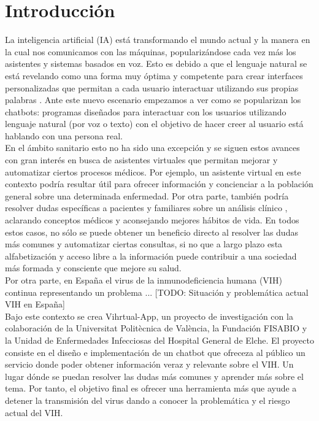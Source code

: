 \section{Introducción}
La inteligencia artificial (IA) está transformando el mundo actual y la manera en la cual nos comunicamos con las máquinas, popularizándose cada vez más los asistentes y sistemas basados en voz. Esto es debido a que el lenguaje natural se está revelando como una forma muy óptima y competente para crear interfaces personalizadas que permitan a cada usuario interactuar utilizando sus propias palabras \cite{naturalDialogue} . Ante este nuevo escenario empezamos a ver como se popularizan los chatbots: programas diseñados para interactuar con los usuarios utilizando lenguaje natural (por voz o texto) con el objetivo de hacer creer al usuario está hablando con una persona real. \\

En el ámbito sanitario esto no ha sido una excepción y se siguen estos avances con gran interés en busca de asistentes virtuales que permitan mejorar y automatizar ciertos procesos médicos\cite{healthAgents}. Por ejemplo, un asistente virtual en este contexto podría resultar útil para ofrecer información y concienciar a la población general sobre una determinada enfermedad. Por otra parte, también podría resolver dudas específicas a pacientes y familiares sobre un análisis clínico \cite{healthAgents}, aclarando conceptos médicos y aconsejando mejores hábitos de vida. En todos estos casos, no sólo se puede obtener un beneficio directo al resolver las dudas más comunes y automatizar ciertas consultas, si no que a largo plazo esta alfabetización y acceso libre a la información puede contribuir a una sociedad más formada y consciente que mejore su salud.\\

Por otra parte, en España el virus de la inmunodeficiencia humana (VIH) continua representando un problema ... [TODO: Situación y problemática actual VIH en España]\\

Bajo este contexto se crea Vihrtual-App, un proyecto de investigación con la colaboración de la Universitat Politècnica de València, la Fundación FISABIO y la Unidad de Enfermedades Infecciosas del Hospital General de Elche. El proyecto consiste en el diseño e implementación de un chatbot que ofreceza al público un servicio donde poder obtener información veraz y relevante sobre el VIH. Un lugar dónde se puedan resolver las dudas más comunes y aprender más sobre el tema. Por tanto, el objetivo final es ofrecer una herramienta más que ayude a detener la transmisión del virus dando a conocer la problemática y el riesgo actual del VIH.\\ %

